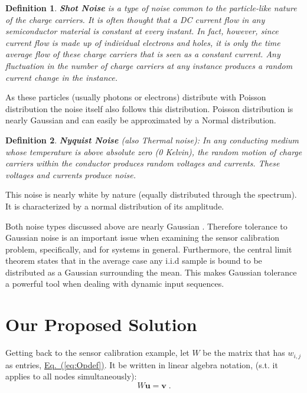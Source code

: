 \documentclass[preprint,12pt]{elsarticle}
\newtheorem{definition}{Definition}
\newcommand{\namedrefeq}[2]{\hyperref[#2]{#1~\mbox{\rm(\ref*{#2})}}}
\newcommand{\equationref}[1]{\namedrefeq{Eq.}{#1}}
\newcommand{\uu}{\mathbf{u}}
\newcommand{\vv}{\mathbf{v}}
\begin{document}
\begin{definition}\label{def:ShotNoise}
{\bf Shot Noise} is a type of noise common to the particle-like nature of the charge carriers. It is often thought that a DC current flow in any semiconductor material is constant at every instant. In fact, however, since current flow is made up of individual electrons and holes, it is only the time average flow of these charge carriers that is seen as a constant current. Any fluctuation in the number of charge carriers at any instance produces a random current change in the instance.
\end{definition}
 As these particles (usually photons or electrons) distribute with Poisson distribution the noise itself also follows this distribution. Poisson distribution is nearly Gaussian and can easily be approximated by a Normal distribution.

\begin{definition}\label{def:NyquistNoise}
{\bf Nyquist Noise} (also Thermal noise): In any conducting medium whose temperature is above absolute zero (0 Kelvin), the random motion of charge carriers within the conductor produces random voltages and currents. These voltages and currents produce noise.
\end{definition}
 This noise is nearly white by nature (equally distributed through the spectrum). It is characterized by a normal distribution of its amplitude.

Both noise types discussed above are nearly Gaussian \cite{GIE}. Therefore tolerance to Gaussian noise is an important issue when examining the sensor calibration problem, specifically, and for systems in general. Furthermore, the central limit theorem states that in the average case any i.i.d sample is bound to be distributed as a Gaussian surrounding the mean. This makes Gaussian tolerance a powerful tool when dealing with dynamic input sequences.

\section{Our Proposed Solution}\label{sec:solution}
Getting back to the sensor calibration example, let $W$ be the matrix that has $w_{i,j}$ as entries,
\equationref{eq:Opdef}. It be written in linear algebra
notation, (s.t. it applies to all nodes simultaneously):
\begin{equation} \label{eq:matrixform}
  W\uu = \vv\;.
\end{equation}
\end{document}

